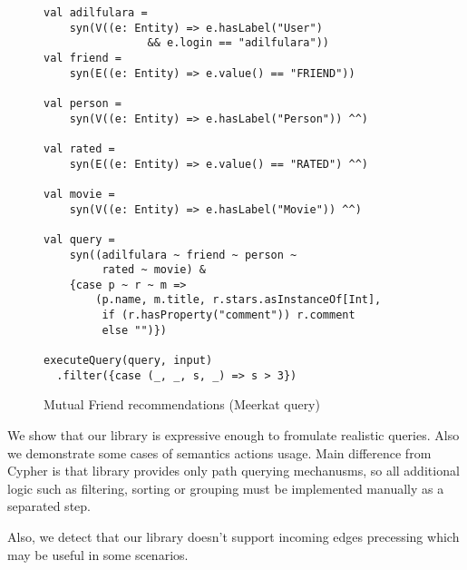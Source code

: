 \begin{figure}[h]
\begin{lstlisting}
val adilfulara = 
    syn(V((e: Entity) => e.hasLabel("User") 
                && e.login == "adilfulara"))
val friend = 
    syn(E((e: Entity) => e.value() == "FRIEND"))

val person = 
    syn(V((e: Entity) => e.hasLabel("Person")) ^^)

val rated = 
    syn(E((e: Entity) => e.value() == "RATED") ^^)

val movie = 
    syn(V((e: Entity) => e.hasLabel("Movie")) ^^)

val query = 
    syn((adilfulara ~ friend ~ person ~ 
         rated ~ movie) &
    {case p ~ r ~ m => 
        (p.name, m.title, r.stars.asInstanceOf[Int],
         if (r.hasProperty("comment")) r.comment 
         else "")})

executeQuery(query, input)
  .filter({case (_, _, s, _) => s > 3})
\end{lstlisting}
\caption{Mutual Friend recommendations (Meerkat query)}
\label{fig:meerkat_movie_query}
\end{figure}

We show that our library is expressive enough to fromulate realistic queries. 
Also we demonstrate some cases of semantics actions usage.
Main difference from Cypher is that library provides only path querying mechanusms, so all additional logic such as
filtering, sorting or grouping must be implemented manually as a separated step.

Also, we detect that our library doesn't support incoming edges precessing which may be useful in some scenarios.